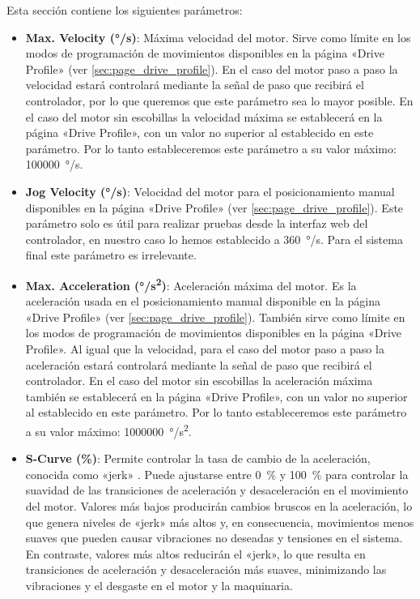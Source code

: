 \documentclass[english,spanish,a4paper,11pt]{article}
\begin{document}
Esta sección contiene los siguientes parámetros:

\begin{itemize}
    \item \textbf{Max. Velocity (\unit{\degree/\s})}: Máxima velocidad del motor. Sirve como límite en los modos de programación de movimientos disponibles en la página «Drive Profile» (ver \cref{sec:page_drive_profile}). En el caso del motor paso a paso la velocidad estará controlará mediante la señal de paso que recibirá el controlador, por lo que queremos que este parámetro sea lo mayor posible. En el caso del motor sin escobillas la velocidad máxima se establecerá en la página «Drive Profile», con un valor no superior al establecido en este parámetro. Por lo tanto estableceremos este parámetro a su valor máximo: \qty{100000}{\degree/\s}.

    \item \textbf{Jog Velocity (\unit{\degree/\s})}: Velocidad del motor para el posicionamiento manual disponibles en la página «Drive Profile» (ver \cref{sec:page_drive_profile}). Este parámetro solo es útil para realizar pruebas desde la interfaz web del controlador, en nuestro caso lo hemos establecido a \qty{360}{\degree/\s}. Para el sistema final este parámetro es irrelevante.

    \item \textbf{Max. Acceleration (\unit{\degree/\s^2})}: Aceleración máxima del motor. Es la aceleración usada en el posicionamiento manual disponible en la página «Drive Profile» (ver \cref{sec:page_drive_profile}). También sirve como límite en los modos de programación de movimientos disponibles en la página «Drive Profile». Al igual que la velocidad, para el caso del motor paso a paso la aceleración estará controlará mediante la señal de paso que recibirá el controlador. En el caso del motor sin escobillas la aceleración máxima también se establecerá en la página «Drive Profile», con un valor no superior al establecido en este parámetro. Por lo tanto estableceremos este parámetro a su valor máximo: \qty{1000000}{\degree/\s^2}.

    \item \textbf{S-Curve (\unit{\percent})}: Permite controlar la tasa de cambio de la aceleración, conocida como «jerk» \cite{enwiki:1178778094}. Puede ajustarse entre \qty{0}{\percent} y \qty{100}{\percent} para controlar la suavidad de las transiciones de aceleración y desaceleración en el movimiento del motor.
    Valores más bajos producirán cambios bruscos en la aceleración, lo que genera niveles de «jerk» más altos y, en consecuencia, movimientos menos suaves que pueden causar vibraciones no deseadas y tensiones en el sistema. En contraste,  valores más altos reducirán el «jerk», lo que resulta en transiciones de aceleración y desaceleración más suaves, minimizando las vibraciones y el desgaste en el motor y la maquinaria.


\end{itemize}
\end{document}
